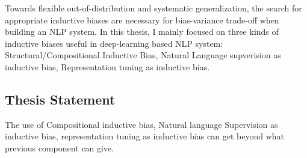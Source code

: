 Towards flexible out-of-distribution and systematic generalization,
the search for appropriate inductive biases are necessary for
bias-variance trade-off when building an NLP system. In this thesis, I
mainly focused on three kinds of inductive biases useful in
deep-learning based NLP system: Structural/Compositional Inductive
Bias, Natural Language supverision as inductive bias, Representation
tuning as inductive bias.

\subsection{Thesis Statement}
\label{ssec:intro:thesis-statemenot}

 The use of Compositional inductive bias, Natural
language Supervision as inductive bias, representation tuning as
inductive bias can get beyond what previous component can give.

